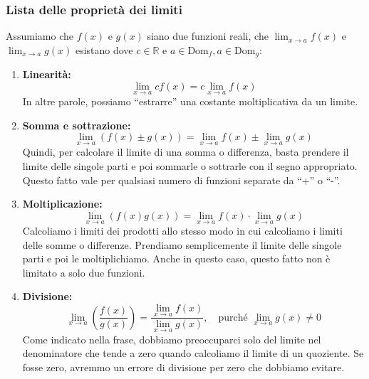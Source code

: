 \documentclass{article}
\begin{document}
\subsubsection{Lista delle proprietà dei limiti}
Assumiamo che \(f(x)\) e \(g(x)\) siano due funzioni reali,
che \(\lim_{x \to a} f(x)\) e \(\lim_{x \to a} g(x)\) esistano dove \(c \in \mathbb{R}\) e
\(a \in \text{Dom}_f, a \in \text{Dom}_g\):
\begin{enumerate}
    \item \textbf{Linearità:}
    \begin{equation*}
        \lim_{x \to a} c f(x) = c \lim_{x \to a} f(x)
    \end{equation*}
    In altre parole, possiamo ``estrarre'' una costante moltiplicativa da un limite.
    
    \item \textbf{Somma e sottrazione:}
    \begin{equation*}
        \lim_{x \to a} \left(f(x) \pm g(x)\right) = \lim_{x \to a} f(x) \pm \lim_{x \to a} g(x)
    \end{equation*}
    Quindi, per calcolare il limite di una somma o differenza, basta prendere il limite delle
    singole parti e poi sommarle o sottrarle con il segno appropriato. Questo fatto vale per
    qualsiasi numero di funzioni separate da ``+'' o ``-''.
    
    \item \textbf{Moltiplicazione:}
    \begin{equation*}
        \lim_{x \to a} \left(f(x) g(x)\right) = \lim_{x \to a} f(x) \cdot \lim_{x \to a} g(x)
    \end{equation*}
    Calcoliamo i limiti dei prodotti allo stesso modo in cui calcoliamo i limiti delle somme
    o differenze. Prendiamo semplicemente il limite delle singole parti e poi le
    moltiplichiamo. Anche in questo caso, questo fatto non è limitato a solo due funzioni.
    
    \item \textbf{Divisione:}
    \begin{equation*}
        \lim_{x \to a} \left( \frac{f(x)}{g(x)} \right) = \frac{\lim_{x \to a} f(x)}{\lim_{x \to a} g(x)}, \quad \text{purché } \lim_{x \to a} g(x) \ne 0
    \end{equation*}
    Come indicato nella frase, dobbiamo preoccuparci solo del limite nel denominatore che
    tende a zero quando calcoliamo il limite di un quoziente. Se fosse zero, avremmo un errore
    di divisione per zero che dobbiamo evitare.
    

\end{enumerate}
\end{document}
